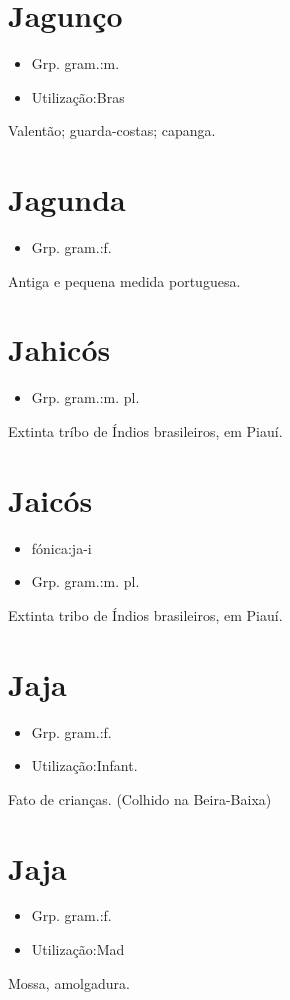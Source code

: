\documentclass{article}
\begin{document}
\section{Jagunço}
\begin{itemize}
\item {Grp. gram.:m.}
\end{itemize}
\begin{itemize}
\item {Utilização:Bras}
\end{itemize}
Valentão; guarda-costas; capanga.
\section{Jagunda}
\begin{itemize}
\item {Grp. gram.:f.}
\end{itemize}
Antiga e pequena medida portuguesa.
\section{Jahicós}
\begin{itemize}
\item {Grp. gram.:m. pl.}
\end{itemize}
Extinta tríbo de Índios brasileiros, em Piauí.
\section{Jaicós}
\begin{itemize}
\item {fónica:ja-i}
\end{itemize}
\begin{itemize}
\item {Grp. gram.:m. pl.}
\end{itemize}
Extinta tribo de Índios brasileiros, em Piauí.
\section{Jaja}
\begin{itemize}
\item {Grp. gram.:f.}
\end{itemize}
\begin{itemize}
\item {Utilização:Infant.}
\end{itemize}
Fato de crianças.
(Colhido na Beira-Baixa)
\section{Jaja}
\begin{itemize}
\item {Grp. gram.:f.}
\end{itemize}
\begin{itemize}
\item {Utilização:Mad}
\end{itemize}
Mossa, amolgadura.
\end{document}
